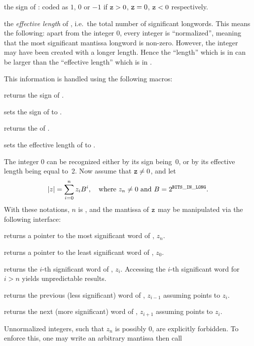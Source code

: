 the sign of : coded as $1$, $0$ or $-1$ if ${\tt z} > 0$, ${\tt z} = 0$,
${\tt z} < 0$ respectively.

the \emph{effective length} of , i.e.~the total number of significant
longwords. This means the following: apart from the integer 0, every integer
is ``normalized'', meaning that the most significant mantissa longword is
non-zero. However, the integer may have been created with a longer length.
Hence the ``length'' which is in  can be larger than the
``effective length'' which is in .

\noindent This information is handled using the following macros:

 returns the sign of .

 sets the sign of  to .

 returns the  of .

 sets the effective length
of  to .

The integer 0 can be recognized either by its sign being~0, or by its
effective length being equal to~2. Now assume that ${\tt z} \ne 0$, and let
$$ |z| = \sum_{i = 0}^n z_i B^i,
  \quad{\rm where}~z_n\ne 0~{\rm and}~B = 2^{{\tt BITS\_IN\_LONG}}.
$$
With these notations, $n$ is , and the mantissa of
${\tt z}$ may be manipulated via the following interface:

 returns a pointer to the most significant word of
, $z_n$.

 returns a pointer to the least significant word of
, $z_0$.

 returns the $i$-th significant word of
, $z_i$. Accessing the $i$-th significant word for $i > n$
yields unpredictable results.

 returns the previous (less significant) word of
, $z_{i-1}$ assuming  points to $z_i$.

 returns the next (more significant) word of ,
$z_{i+1}$ assuming  points to $z_i$.

Unnormalized integers, such that $z_n$ is possibly $0$, are explicitly
forbidden. To enforce this, one may write an arbitrary mantissa then call


